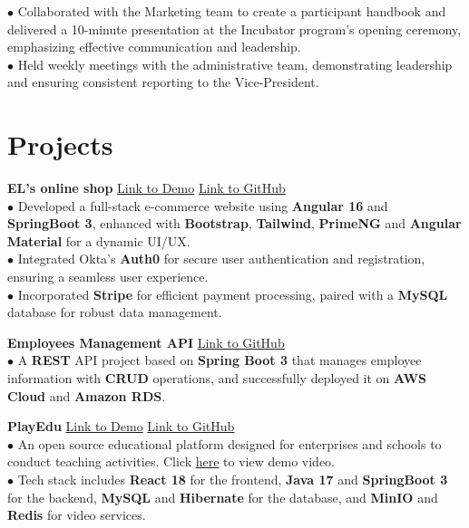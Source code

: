 \documentclass[letterpaper,12pt]{article}
\begin{document}
\hspace{0.1cm} $\bullet$ \hspace{0.001cm}Collaborated with the Marketing team to create a participant handbook and delivered a 10-minute presentation at the Incubator program's opening ceremony, emphasizing effective communication and leadership.\\
\hspace{0.1cm} $\bullet$ \hspace{0.05cm}Held weekly meetings with the administrative team, demonstrating leadership and ensuring consistent reporting to the Vice-President.


\section{Projects}

\textbf{EL's online shop} \hfill \href{https://youtu.be/q0_N9ydf67c}{Link to Demo} \hspace{0.2cm} \href{https://github.com/Zicheng-Li/Angular-ecommerce-frontend}{Link to GitHub}\\
\hspace{0.1cm} $\bullet$ Developed a full-stack e-commerce website using \textbf{Angular 16} and \textbf{SpringBoot 3}, enhanced with \textbf{Bootstrap}, \textbf{Tailwind}, \textbf{PrimeNG} and \textbf{Angular Material} for a dynamic UI/UX. \\
\hspace{0.1cm} $\bullet$ Integrated Okta's \textbf{Auth0} for secure user authentication and registration, ensuring a seamless user experience. \\ 
\hspace{0.1cm} $\bullet$ Incorporated \textbf{Stripe} for efficient payment processing, paired with a \textbf{MySQL} database for robust data management.

\textbf{Employees Management API} \hfill \href{https://github.com/Zicheng-Li/employees-management-project}{Link to GitHub} \\
\hspace{0.1cm} $\bullet$ A \textbf{REST} API project based on \textbf{Spring Boot 3} that manages employee information with \textbf{CRUD} operations, and successfully deployed it on \textbf{AWS Cloud} and \textbf{Amazon RDS}.

\textbf{PlayEdu} \hfill \href{https://youtu.be/8IWqM2eHLhc}{Link to Demo} \hspace{0.2cm} \href{https://github.com/Zicheng-Li/React-Spring_Boot-PlayEdu}{Link to GitHub} \\
\hspace{0.1cm} $\bullet$ An open source educational platform designed for enterprises and schools to conduct teaching activities. Click \href{https://youtu.be/8IWqM2eHLhc}{here} to view demo video.\\
\hspace{0.1cm} $\bullet$ Tech stack includes \textbf{React 18} for the frontend, \textbf{Java 17} and \textbf{SpringBoot 3} for the backend, \textbf{MySQL} and \textbf{Hibernate} for the database, and \textbf{MinIO} and \textbf{Redis} for video services.
\end{document}
